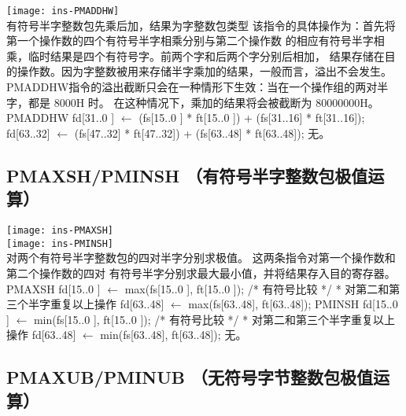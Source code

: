 \begin{instructionblk}
  \texttt{[image: ins-PMADDHW]} \\
  {有符号半字整数包先乘后加，结果为字整数包类型}
  {该指令的具体操作为：首先将第一个操作数的四个有符号半字相乘分别与第二个操作数
  的相应有符号半字相乘，临时结果是四个有符号字。前两个字和后两个字分别后相加，
  结果存储在目的操作数。因为字整数被用来存储半字乘加的结果，一般而言，溢出不会发生。
  PMADDHW指令的溢出截断只会在一种情形下生效：当在一个操作组的两对半字，都是 8000H 时。
  在这种情况下，乘加的结果将会被截断为 80000000H。}
  {PMADDHW \narrownewline
  fd[31..0 ] $\leftarrow$ (fs[15..0 ] * ft[15..0 ]) + (fs[31..16] * ft[31..16]); \narrownewline
  fd[63..32] $\leftarrow$ (fs[47..32] * ft[47..32]) + (fs[63..48] * ft[63..48]);}
  {无。}
\end{instructionblk}

\subsection{PMAXSH/PMINSH （有符号半字整数包极值运算）}

\begin{instructionblk}
  \texttt{[image: ins-PMAXSH]} \\
  \texttt{[image: ins-PMINSH]} \\
  {对两个有符号半字整数包的四对半字分别求极值。}
  {这两条指令对第一个操作数和第二个操作数的四对
  有符号半字分别求最大最小值，并将结果存入目的寄存器。}
  {PMAXSH \narrownewline
  fd[15..0 ] $\leftarrow$ max(fs[15..0 ], ft[15..0 ]); /* 有符号比较 */ \narrownewline
  * 对第二和第三个半字重复以上操作 \narrownewline
  fd[63..48] $\leftarrow$ max(fs[63..48], ft[63..48]); \narrownewline \narrownewline
  PMINSH \narrownewline
  fd[15..0 ] $\leftarrow$ min(fs[15..0 ], ft[15..0 ]); /* 有符号比较 */ \narrownewline
  * 对第二和第三个半字重复以上操作 \narrownewline
  fd[63..48] $\leftarrow$ min(fs[63..48], ft[63..48]);}
  {无。}
\end{instructionblk}

\subsection{PMAXUB/PMINUB （无符号字节整数包极值运算）}


